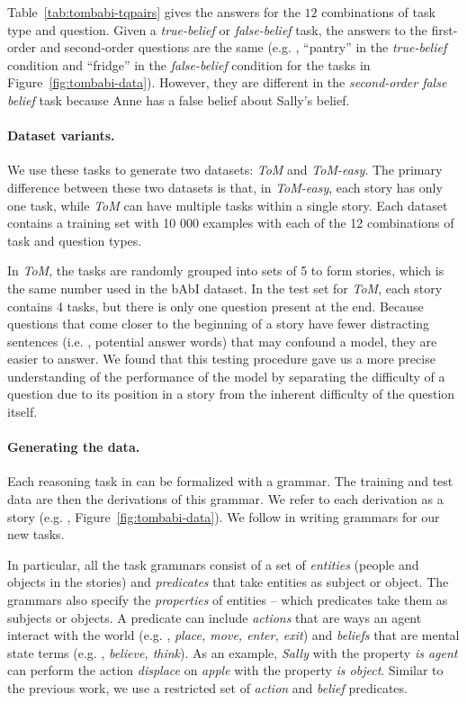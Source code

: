 Table~\ref{tab:tombabi-tqpairs} gives the answers for the $12$ combinations of task type and question. Given a \textit{true-belief} or \textit{false-belief} task, the answers to the first-order and second-order questions are the same (e.g. , ``pantry'' in the \textit{true-belief} condition and ``fridge'' in the \textit{false-belief} condition for the tasks in Figure~\ref{fig:tombabi-data}).
However, they are different in the \textit{second-order false belief} task because Anne has a false belief about Sally's belief.

\paragraph{Dataset variants.} We use these tasks to generate two  datasets: \textit{ToM} and \textit{ToM-easy}. The primary difference between these two datasets is that, in \textit{ToM-easy}, each story has only one task, while \textit{ToM} can have multiple tasks within a single story. Each dataset contains a training set with 10 000 examples with each of the 12 combinations of task and question types. 

In \textit{ToM}, the tasks are randomly grouped into sets of 5 to form stories, which is the same number used in the bAbI dataset. In the test set for \textit{ToM}, each story contains 4 tasks, but there is only one question present at the end. Because questions that come closer to the beginning of a story have fewer distracting sentences (i.e. , potential answer words) that may confound a model, they are easier to answer.  We found that this testing procedure gave us a more precise understanding of the performance of the model by separating the difficulty of a question due to its position in a story from the inherent difficulty of the question itself.

\paragraph{Generating the data.} Each reasoning task in \citet{weston2016towards} can be formalized with a grammar. The training and test data are then the derivations of this grammar. We refer to each derivation as a story (e.g. , Figure~\ref{fig:tombabi-data}). We follow \citet{grant.etal.2017} in writing grammars for our new tasks. 

In particular, all the task grammars consist of a set of \textit{entities}
(people and objects in the stories) and \textit{predicates} that take entities as subject or object. The grammars also specify the \textit{properties} of entities -- which predicates take them as subjects or objects. A predicate can include \textit{actions} that are ways an agent interact with the world (e.g. ,
\textit{place, move, enter, exit}) and \textit{beliefs} that are mental state terms (e.g. , \textit{believe, think}).  As an example, \textit{Sally} with the property \textit{is agent} can perform the action \textit{displace} on
\textit{apple} with the property \textit{is object}.  Similar to the previous work, we use a restricted set of \textit{action} and \textit{belief}
predicates.

